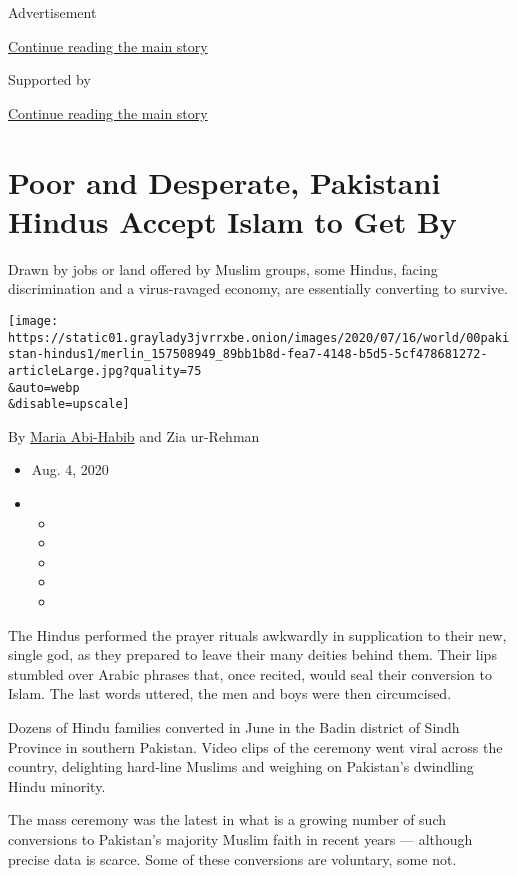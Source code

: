 Advertisement

\protect\hyperlink{after-top}{Continue reading the main story}

Supported by

\protect\hyperlink{after-sponsor}{Continue reading the main story}

\hypertarget{poor-and-desperate-pakistani-hindus-accept-islam-to-get-by}{%
\section{Poor and Desperate, Pakistani Hindus Accept Islam to Get
By}\label{poor-and-desperate-pakistani-hindus-accept-islam-to-get-by}}

Drawn by jobs or land offered by Muslim groups, some Hindus, facing
discrimination and a virus-ravaged economy, are essentially converting
to survive.

\texttt{[image: https://static01.graylady3jvrrxbe.onion/images/2020/07/16/world/00pakistan-hindus1/merlin\_157508949\_89bb1b8d-fea7-4148-b5d5-5cf478681272-articleLarge.jpg?quality=75\\\&auto=webp\\\&disable=upscale]}

By \href{https://www.nytimes3xbfgragh.onion/by/maria-abi-habib}{Maria
Abi-Habib} and Zia ur-Rehman

\begin{itemize}
\item
  Aug. 4, 2020
\item
  \begin{itemize}
  \item
  \item
  \item
  \item
  \item
  \end{itemize}
\end{itemize}

The Hindus performed the prayer rituals awkwardly in supplication to
their new, single god, as they prepared to leave their many deities
behind them. Their lips stumbled over Arabic phrases that, once recited,
would seal their conversion to Islam. The last words uttered, the men
and boys were then circumcised.

Dozens of Hindu families converted in June in the Badin district of
Sindh Province in southern Pakistan. Video clips of the ceremony went
viral across the country, delighting hard-line Muslims and weighing on
Pakistan's dwindling Hindu minority.

The mass ceremony was the latest in what is a growing number of such
conversions to Pakistan's majority Muslim faith in recent years ---
although precise data is scarce. Some of these conversions are
voluntary, some not.


